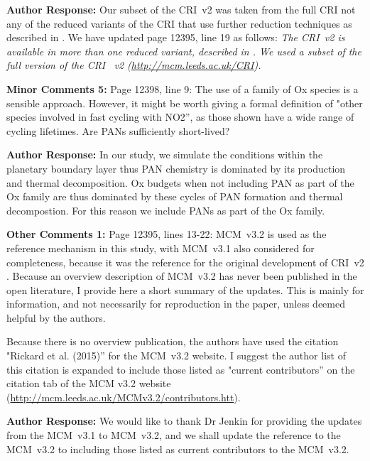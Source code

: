 \documentclass{article}
\begin{document}
\textbf{Author Response:} Our subset of the CRI~v2 was taken from the full CRI not any of the reduced variants of the CRI that use further reduction techniques as described in \citet{Watson:2008}.
We have updated page 12395, line 19 as follows: \textit{The CRI~v2 is available in more than one reduced variant, described in \citet{Watson:2008}. We used a subset of the full version of the CRI~ v2 (\url{http://mcm.leeds.ac.uk/CRI}).}

\textbf{Minor Comments 5:} Page 12398, line 9: The use of a family of Ox species is a sensible approach. However, it might be worth giving a formal definition of "other species involved in fast cycling with NO2'', as those shown have a wide range of cycling lifetimes. Are PANs sufficiently short-lived?

\textbf{Author Response:} In our study, we simulate the conditions within the planetary boundary layer thus PAN chemistry is dominated by its production and thermal decomposition. Ox budgets when not including PAN as part of the Ox family are thus dominated by these cycles of PAN formation and thermal decompostion. For this reason we include PANs as part of the Ox family.

\textbf{Other Comments 1:} Page 12395, lines 13-22: MCM~v3.2 is used as the reference mechanism in this study, with MCM~v3.1 also considered for completeness, because it was the reference for the original development of CRI~v2 \citep{Jenkin:2008}. Because an overview description of MCM~v3.2 has never been published in the open literature, I provide here a short summary of the updates. This is mainly for information, and not necessarily for reproduction in the paper, unless deemed helpful by the authors.

Because there is no overview publication, the authors have used the citation "Rickard et al. (2015)'' for the MCM~v3.2 website. I suggest the author list of this citation is expanded to include those listed as "current contributors'' on the citation tab of the MCM v3.2 website (\url{http://mcm.leeds.ac.uk/MCMv3.2/contributors.htt}).

\textbf{Author Response:} We would like to thank Dr Jenkin for providing the updates from the MCM~v3.1 to MCM~v3.2, and we shall update the reference to the MCM~v3.2 to \citep{MCM_Site} including those listed as current contributors to the MCM~v3.2.
\end{document}
